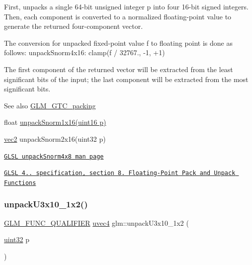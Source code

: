 First, unpacks a single 64-\/bit unsigned integer p into four 16-\/bit signed integers. Then, each component is converted to a normalized floating-\/point value to generate the returned four-\/component vector.

The conversion for unpacked fixed-\/point value f to floating point is done as follows\+: unpack\+Snorm4x16\+: clamp(f / 32767., -\/1, +1)

The first component of the returned vector will be extracted from the least significant bits of the input; the last component will be extracted from the most significant bits.

\begin{DoxySeeAlso}{See also}
\hyperlink{group__gtc__packing}{G\+L\+M\+\_\+\+G\+T\+C\+\_\+packing} 

float \hyperlink{group__gtc__packing_ga246f451cebf590726324f7a283e3d65e}{unpack\+Snorm1x16(uint16 p)} 

\hyperlink{group__core__types_gaa1618f51db67eaa145db101d8c8431d8}{vec2} unpack\+Snorm2x16(uint32 p) 

\href{http://www.opengl.org/sdk/docs/manglsl/xhtml/unpackSnorm2x16.xml}{\tt G\+L\+SL unpack\+Snorm4x8 man page} 

\href{http://www.opengl.org/registry/doc/GLSLangSpec.4.20.8.pdf}{\tt G\+L\+SL 4.. specification, section 8. Floating-\/\+Point Pack and Unpack Functions} 
\end{DoxySeeAlso}
\mbox{\label{group__gtc__packing_ga119aa2d7d55952f9dc4214390a6ffefc}} 
\subsubsection{\texorpdfstring{unpack\+U3x10\+\_\+1x2()}{unpackU3x10\_1x2()}}
{\footnotesize\ttfamily \hyperlink{setup_8hpp_a33fdea6f91c5f834105f7415e2a64407}{G\+L\+M\+\_\+\+F\+U\+N\+C\+\_\+\+Q\+U\+A\+L\+I\+F\+I\+ER} \hyperlink{group__core__types_ga1c426d19627b32b14f0089f7f4ba7b1d}{uvec4} glm\+::unpack\+U3x10\+\_\+1x2 (\begin{DoxyParamCaption}\item[{\hyperlink{group__gtc__type__precision_ga202b6a53c105fcb7e531f9b443518451}{uint32}}]{p }\end{DoxyParamCaption})}

